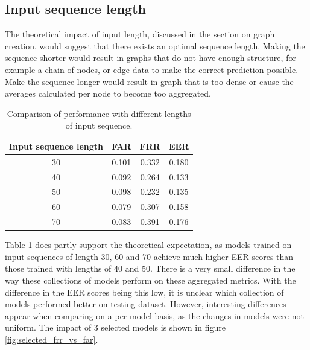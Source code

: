 \subsection{Input sequence length}
The theoretical impact of input length, discussed in the section on graph creation, would suggest that there exists an optimal sequence length. Making the sequence shorter would result in graphs that do not have enough structure, for example a chain of nodes, or edge data to make the correct prediction possible. Make the sequence longer would result in graph that is too dense or cause the averages calculated per node to become too aggregated.\\


\begin{center}
	\begin{table}[H]
		\begin{center}
			\begin{tabular}{ |c|c|c|c| } 
				\hline
				Input sequence length & FAR & FRR & EER \\
				\hline
				30 & 0.101 & 0.332 & 0.180 \\
				\hline
				40 & 0.092 & 0.264 & 0.133 \\
				\hline
				50 & 0.098 & 0.232 & 0.135 \\
				\hline
				60 & 0.079 & 0.307 & 0.158 \\
				\hline
				70 & 0.083 & 0.391 & 0.176 \\
				\hline
			\end{tabular}
		\end{center}
		\caption{Comparison of performance with different lengths of input sequence.}
		\label{table:len_vs_perf}
	\end{table}
\end{center}


Table \ref{table:len_vs_perf} does partly support the theoretical expectation, as models trained on input sequences of length 30, 60 and 70 achieve much higher EER scores than those trained with lengths of 40 and 50. There is a very small difference in the way these collections of models perform on these aggregated metrics. 
With the difference in the EER scores being this low, it is unclear which collection of models performed better on testing dataset.
However, interesting differences appear when comparing on a per model basis, as the changes in models were not uniform. The impact of 3 selected models is shown in figure \ref{fig:selected_frr_vs_far}. 

